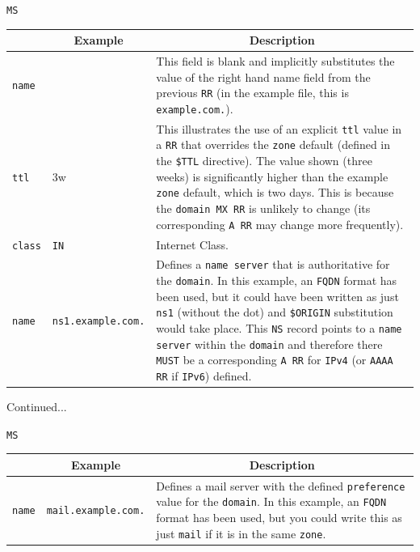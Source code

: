 \documentclass[xcolor=table]{beamer}
\begin{document}
\begin{frame}{\texttt{MS}}
  \begin{table}
    \tiny
    \begin{tabular}{|p{1.6cm}|p{1.6cm}|p{4.7cm}|} 
      \hline
      \rowcolor{gray}
      \multicolumn{1}{|c|}{Syntax} & \multicolumn{1}{c|}{Example} & \multicolumn{1}{c|}{Description}\\ 
      \hline
      \texttt{name}&&This field is blank and implicitly substitutes the value of the right hand name field from the previous \texttt{RR} (in the example file, this is \texttt{example.com.}).\\
      \hline
      \texttt{ttl}&3w&This illustrates the use of an explicit \texttt{ttl} value in a \texttt{RR} that overrides the \texttt{zone} default (defined in the \texttt{\$TTL} directive). The value shown (three weeks) is significantly higher than the example \texttt{zone} default, which is two days. This is because the \texttt{domain MX RR} is unlikely to change (its corresponding \texttt{A RR} may change more frequently).\\
      \hline
      \texttt{class}&\texttt{IN}&Internet Class.\\
      \hline
      \texttt{name}&\texttt{ns1.example.com.}&Defines a \texttt{name server} that is authoritative for the \texttt{domain}. In this example, an \texttt{FQDN} format has been used, but it could have been written as just \texttt{ns1} (without the dot) and \texttt{\$ORIGIN} substitution would take place. This \texttt{NS} record points to a \texttt{name server} within the \texttt{domain} and therefore there \texttt{MUST} be a corresponding \texttt{A RR} for \texttt{IPv4} (or \texttt{AAAA RR} if \texttt{IPv6}) defined.\\
      \hline
    \end{tabular}
  \end{table}
  Continued...
\end{frame}

\begin{frame}{\texttt{MS}}
  \begin{table}
    \tiny
    \begin{tabular}{|p{1.6cm}|p{1.7cm}|p{4.7cm}|} 
      \hline
      \rowcolor{gray}
      \multicolumn{1}{|c|}{Syntax} & \multicolumn{1}{c|}{Example} & \multicolumn{1}{c|}{Description}\\ 
      \hline
      \texttt{name}&\texttt{mail.example.com.}&Defines a mail server with the defined \texttt{preference} value for the \texttt{domain}. In this example, an \texttt{FQDN} format has been used, but you could write this as just \texttt{mail} if it is in the same \texttt{zone}.\\
      \hline
    \end{tabular}
  \end{table}
\end{frame}
\end{document}
